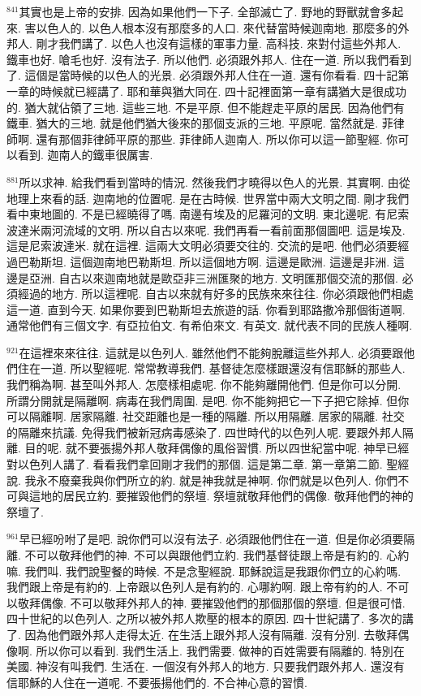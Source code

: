 \documentclass{book}
\begin{document}
$^{841}$其實也是上帝的安排.
因為如果他們一下子.
全部滅亡了.
野地的野獸就會多起來.
害以色人的.
以色人根本沒有那麼多的人口.
來代替當時候迦南地.
那麼多的外邦人.
剛才我們講了.
以色人也沒有這樣的軍事力量.
高科技.
來對付這些外邦人.
鐵車也好.
嗆毛也好.
沒有法子.
所以他們.
必須跟外邦人.
住在一道.
所以我們看到了.
這個是當時候的以色人的光景.
必須跟外邦人住在一道.
還有你看看.
四十記第一章的時候就已經講了.
耶和華與猶大同在.
四十記裡面第一章有講猶大是很成功的.
猶大就佔領了三地.
這些三地.
不是平原.
但不能趕走平原的居民.
因為他們有鐵車.
猶大的三地.
就是他們猶大後來的那個支派的三地.
平原呢.
當然就是.
菲律師啊.
還有那個菲律師平原的那些.
菲律師人迦南人.
所以你可以這一節聖經.
你可以看到.
迦南人的鐵車很厲害.

$^{881}$所以求神.
給我們看到當時的情況.
然後我們才曉得以色人的光景.
其實啊.
由從地理上來看的話.
迦南地的位置呢.
是在古時候.
世界當中兩大文明之間.
剛才我們看中東地圖的.
不是已經曉得了嗎.
南邊有埃及的尼羅河的文明.
東北邊呢.
有尼索波達米兩河流域的文明.
所以自古以來呢.
我們再看一看前面那個圖吧.
這是埃及.
這是尼索波達米.
就在這裡.
這兩大文明必須要交往的.
交流的是吧.
他們必須要經過巴勒斯坦.
這個迦南地巴勒斯坦.
所以這個地方啊.
這邊是歐洲.
這邊是非洲.
這邊是亞洲.
自古以來迦南地就是歐亞非三洲匯聚的地方.
文明匯那個交流的那個.
必須經過的地方.
所以這裡呢.
自古以來就有好多的民族來來往往.
你必須跟他們相處這一道.
直到今天.
如果你要到巴勒斯坦去旅遊的話.
你看到耶路撒冷那個街道啊.
通常他們有三個文字.
有亞拉伯文.
有希伯來文.
有英文.
就代表不同的民族人種啊.

$^{921}$在這裡來來往往.
這就是以色列人.
雖然他們不能夠脫離這些外邦人.
必須要跟他們住在一道.
所以聖經呢.
常常教導我們.
基督徒怎麼樣跟還沒有信耶穌的那些人.
我們稱為啊.
甚至叫外邦人.
怎麼樣相處呢.
你不能夠離開他們.
但是你可以分開.
所謂分開就是隔離啊.
病毒在我們周圍.
是吧.
你不能夠把它一下子把它除掉.
但你可以隔離啊.
居家隔離.
社交距離也是一種的隔離.
所以用隔離.
居家的隔離.
社交的隔離來抗議.
免得我們被新冠病毒感染了.
四世時代的以色列人呢.
要跟外邦人隔離.
目的呢.
就不要張揚外邦人敬拜偶像的風俗習慣.
所以四世紀當中呢.
神早已經對以色列人講了.
看看我們拿回剛才我們的那個.
這是第二章.
第一章第二節.
聖經說.
我永不廢棄我與你們所立的約.
就是神我就是神啊.
你們就是以色列人.
你們不可與這地的居民立約.
要摧毀他們的祭壇.
祭壇就敬拜他們的偶像.
敬拜他們的神的祭壇了.

$^{961}$早已經吩咐了是吧.
說你們可以沒有法子.
必須跟他們住在一道.
但是你必須要隔離.
不可以敬拜他們的神.
不可以與跟他們立約.
我們基督徒跟上帝是有約的.
心約嘛.
我們叫.
我們說聖餐的時候.
不是念聖經說.
耶穌說這是我跟你們立的心約嗎.
我們跟上帝是有約的.
上帝跟以色列人是有約的.
心哪約啊.
跟上帝有約的人.
不可以敬拜偶像.
不可以敬拜外邦人的神.
要摧毀他們的那個那個的祭壇.
但是很可惜.
四十世紀的以色列人.
之所以被外邦人欺壓的根本的原因.
四十世紀講了.
多次的講了.
因為他們跟外邦人走得太近.
在生活上跟外邦人沒有隔離.
沒有分別.
去敬拜偶像啊.
所以你可以看到.
我們生活上.
我們需要.
做神的百姓需要有隔離的.
特別在美國.
神沒有叫我們.
生活在.
一個沒有外邦人的地方.
只要我們跟外邦人.
還沒有信耶穌的人住在一道呢.
不要張揚他們的.
不合神心意的習慣.
\end{document}
